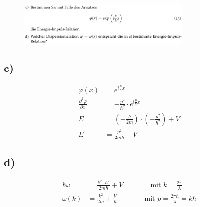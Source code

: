 \begin{figure}[H]
    \centering
    \includegraphics[width=0.75\textwidth]{images/Aufgabe_3cd.jpg}
    \label{fig:4}
\end{figure}

\subsection{c)}

    \begin{align}
        \varphi(x) &= e^{i \frac{p}{\hbar} x}\\
        \frac{\partial^2 \varphi}{\partial x} &= - \frac{p^2}{\hbar^2} \cdot e^{i \frac{p}{\hbar} x}\\
        E &= (- \frac{\hbar}{2m}) \cdot (- \frac{p^2}{\hbar^2}) + V\\
        E &= \frac{p^2}{2m \hbar} + V
    \end{align}

\subsection{d)}

    \begin{align}
        \hbar \omega &= \frac{k^2 \cdot \hbar^2}{2m\hbar} + V \qquad \qquad \text{mit $k = \frac{2\pi}{\lambda}$}\\
        \omega(k) &= \frac{k^2}{2m} + \frac{V}{\hbar} \qquad \qquad \text{mit $p = \frac{2\pi \hbar}{\lambda} = k\hbar$}
    \end{align}

